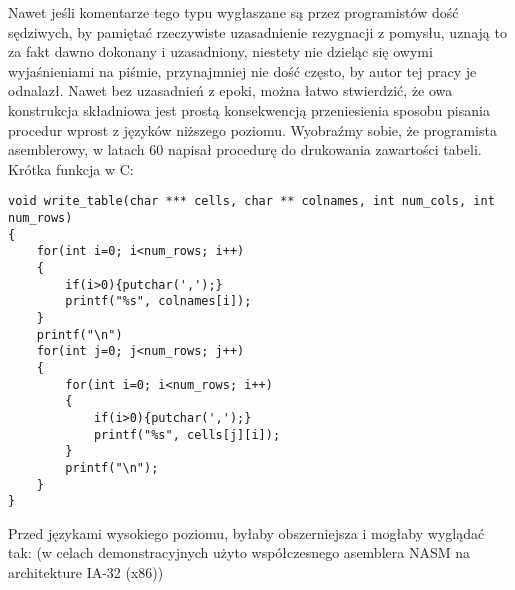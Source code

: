 Nawet jeśli komentarze tego typu wygłaszane są przez programistów dość sędziwych, by pamiętać rzeczywiste uzasadnienie rezygnacji z pomysłu, uznają to za fakt dawno dokonany i uzasadniony, niestety nie dzieląc się owymi wyjaśnieniami na piśmie, przynajmniej nie dość często, by autor tej pracy je odnalazł.
Nawet bez uzasadnień z epoki, można łatwo stwierdzić, że owa konstrukcja składniowa jest prostą konsekwencją przeniesienia sposobu pisania procedur wprost z języków niższego poziomu. Wyobraźmy sobie, że programista asemblerowy, w latach 60 napisał procedurę do drukowania zawartości tabeli. Krótka funkcja w C:

\begin{lstlisting}
void write_table(char *** cells, char ** colnames, int num_cols, int num_rows)
{
    for(int i=0; i<num_rows; i++)
    {
        if(i>0){putchar(',');}
        printf("%s", colnames[i]);
    }
    printf("\n")
    for(int j=0; j<num_rows; j++)
    {
        for(int i=0; i<num_rows; i++)
        {
            if(i>0){putchar(',');}
            printf("%s", cells[j][i]);
        }
        printf("\n");
    }
}
\end{lstlisting}

Przed językami wysokiego poziomu, byłaby obszerniejsza i mogłaby wyglądać tak:
(w celach demonstracyjnych użyto współczesnego asemblera NASM na architekture IA-32 (x86))

